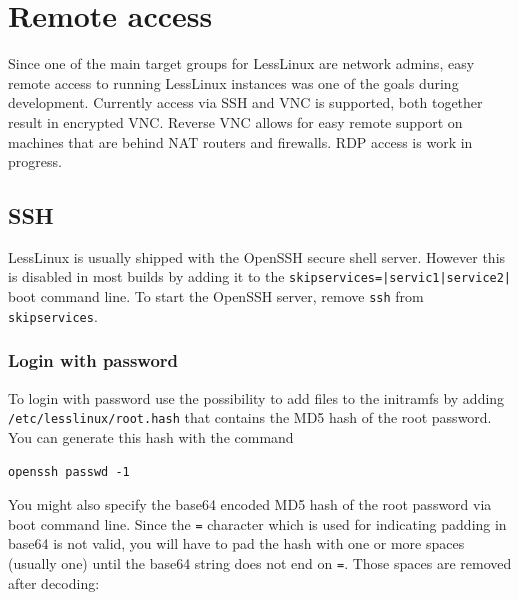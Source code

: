 
\hypertarget{remote}{} 
\section{Remote access}

Since one of the main target groups for LessLinux are network admins, easy remote access to running LessLinux instances was one of the goals during development. Currently access via  SSH and  VNC is supported, both together result in encrypted VNC. Reverse VNC allows for easy remote support on machines that are behind NAT routers and firewalls. RDP access is work in progress. 

\hypertarget{ssh}{} 
\subsection{SSH}

LessLinux is usually shipped with the OpenSSH secure shell server. However this is disabled in most builds by adding it to the \texttt{skipservices=|servic1|service2|} boot command line. To start the OpenSSH server, remove \texttt{ssh} from \texttt{skipservices}.


\subsubsection{Login with password}

To login with password use the possibility to add files to the initramfs by adding \texttt{/etc/lesslinux/root.hash} that contains the MD5 hash of the root password. You can generate this hash with the command

\begin{verbatim}
openssh passwd -1 
\end{verbatim}

You might also specify the base64 encoded MD5 hash of the root password via boot command line. Since the \texttt{=} character which is used for indicating padding in base64 is not valid, you will have to pad the hash with one or more spaces (usually one) until the base64 string does not end on \texttt{=}. Those spaces are removed after decoding:

